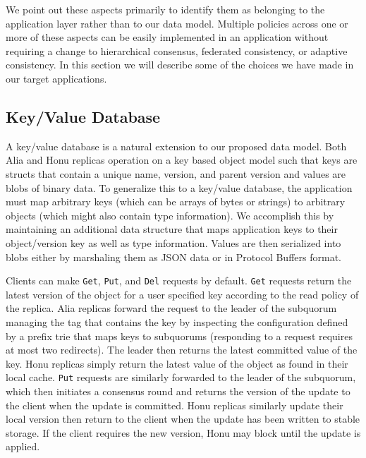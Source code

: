 We point out these aspects primarily to identify them as belonging to the application layer rather than to our data model.
Multiple policies across one or more of these aspects can be easily implemented in an application without requiring a change to hierarchical consensus, federated consistency, or adaptive consistency.
In this section we will describe some of the choices we have made in our target applications.

\subsection{Key/Value Database}
\label{ch05_key_value_db}

A key/value database is a natural extension to our proposed data model.
Both Alia and Honu replicas operation on a key based object model such that keys are structs that contain a unique name, version, and parent version and values are blobs of binary data.
To generalize this to a key/value database, the application must map arbitrary keys (which can be arrays of bytes or strings) to arbitrary objects (which might also contain type information).
We accomplish this by maintaining an additional data structure that maps application keys to their object/version key as well as type information.
Values are then serialized into blobs either by marshaling them as JSON data or in Protocol Buffers format.

Clients can make \texttt{Get}, \texttt{Put}, and \texttt{Del} requests by default.
\texttt{Get} requests return the latest version of the object for a user specified key according to the read policy of the replica.
Alia replicas forward the request to the leader of the subquorum managing the tag that contains the key by inspecting the configuration defined by a prefix trie that maps keys to subquorums (responding to a request requires at most two redirects).
The leader then returns the latest committed value of the key.
Honu replicas simply return the latest value of the object as found in their local cache.
\texttt{Put} requests are similarly forwarded to the leader of the subquorum, which then initiates a consensus round and returns the version of the update to the client when the update is committed.
Honu replicas similarly update their local version then return to the client when the update has been written to stable storage.
If the client requires the new version, Honu may block until the update is applied.

